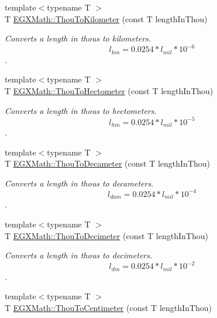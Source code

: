 \begin{DoxyCompactItemize}
{\footnotesize template$<$typename T $>$ }\\T \mbox{\hyperlink{group___e_g_x_math-_conversions-_length_conversions-_imperial-_thou-_s_i_ga659ca5f57bc87f49d568df8a3abb5ed3}{E\+G\+X\+Math\+::\+Thou\+To\+Kilometer}} (const T length\+In\+Thou)
\begin{DoxyCompactList}\small\item\em Converts a length in thous to kilometers. \[ l_{km}=0.0254 * l_{mil} * 10^{-6} \]. \end{DoxyCompactList}\item 
{\footnotesize template$<$typename T $>$ }\\T \mbox{\hyperlink{group___e_g_x_math-_conversions-_length_conversions-_imperial-_thou-_s_i_ga6493263a0400fe1dfa4ef0ab50be59de}{E\+G\+X\+Math\+::\+Thou\+To\+Hectometer}} (const T length\+In\+Thou)
\begin{DoxyCompactList}\small\item\em Converts a length in thous to hectometers. \[ l_{hm}=0.0254 * l_{mil} * 10^{-5} \]. \end{DoxyCompactList}\item 
{\footnotesize template$<$typename T $>$ }\\T \mbox{\hyperlink{group___e_g_x_math-_conversions-_length_conversions-_imperial-_thou-_s_i_gab03dfc8772a388c93d1504f2b1c5717a}{E\+G\+X\+Math\+::\+Thou\+To\+Decameter}} (const T length\+In\+Thou)
\begin{DoxyCompactList}\small\item\em Converts a length in thous to decameters. \[ l_{dam}=0.0254 * l_{mil} * 10^{-4} \]. \end{DoxyCompactList}\item 
{\footnotesize template$<$typename T $>$ }\\T \mbox{\hyperlink{group___e_g_x_math-_conversions-_length_conversions-_imperial-_thou-_s_i_ga9eb7f14e77defb2c5008314b9c92e6dd}{E\+G\+X\+Math\+::\+Thou\+To\+Decimeter}} (const T length\+In\+Thou)
\begin{DoxyCompactList}\small\item\em Converts a length in thous to decimeters. \[ l_{dm}=0.0254 * l_{mil} * 10^{-2} \]. \end{DoxyCompactList}\item 
{\footnotesize template$<$typename T $>$ }\\T \mbox{\hyperlink{group___e_g_x_math-_conversions-_length_conversions-_imperial-_thou-_s_i_ga8c02f5046eede6e801c206cbd02d1055}{E\+G\+X\+Math\+::\+Thou\+To\+Centimeter}} (const T length\+In\+Thou)

\end{DoxyCompactItemize}
